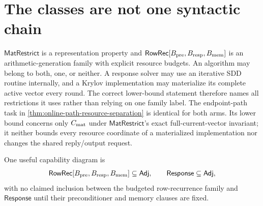 \section{The classes are not one syntactic chain}
\label{sec:not-chain}

$\mathsf{MatRestrict}$ is a representation property and
$\mathsf{RowRec}[B_{\rm pre},B_{\rm resp},B_{\rm mem}]$ is an
arithmetic-generation family with explicit resource budgets.  An algorithm may
belong to both, one, or neither.  A response solver may use an iterative SDD
routine internally, and a Krylov implementation may materialize its complete
active vector every round.  The correct lower-bound statement therefore names
all restrictions it uses rather than relying on one family label.  The
endpoint-path task in \cref{thm:online-path-resource-separation} is identical
for both arms.  Its lower bound concerns only $C_{\rm mat}$ under
$\mathsf{MatRestrict}$'s exact full-current-vector invariant; it neither
bounds every resource coordinate of a materialized implementation nor changes
the shared reply/output request.

One useful capability diagram is
\[
 \mathsf{RowRec}[B_{\rm pre},B_{\rm resp},B_{\rm mem}]
 \subseteq\mathsf{Adj},
 \qquad
 \mathsf{Response}\subseteq\mathsf{Adj},
\]
with no claimed inclusion between the budgeted row-recurrence family and
$\mathsf{Response}$ until their preconditioner and memory clauses are fixed.
